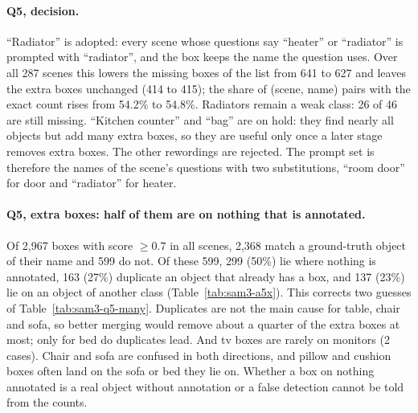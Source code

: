 \paragraph{Q5, decision.}
``Radiator'' is adopted: every scene whose questions say ``heater'' or ``radiator'' is prompted with ``radiator'',
and the box keeps the name the question uses. Over all 287 scenes this lowers the missing boxes of the list from
641 to 627 and leaves the extra boxes unchanged (414 to 415); the share of (scene, name) pairs with the exact
count rises from 54.2\% to 54.8\%. Radiators remain a weak class: 26 of 46 are still missing.
``Kitchen counter'' and ``bag'' are on hold: they find nearly all objects but add many extra boxes, so they are
useful only once a later stage removes extra boxes. The other rewordings are rejected. The prompt set is
therefore the names of the scene's questions with two substitutions, ``room door'' for door and ``radiator''
for heater.

\paragraph{Q5, extra boxes: half of them are on nothing that is annotated.}
Of 2,967 boxes with score $\geq 0.7$ in all scenes, 2,368 match a ground-truth object of their name and 599 do
not. Of these 599, 299 (50\%) lie where nothing is annotated, 163 (27\%) duplicate an object that already has a
box, and 137 (23\%) lie on an object of another class (Table~\ref{tab:sam3-a5x}). This corrects two guesses of
Table~\ref{tab:sam3-q5-many}. Duplicates are not the main cause for table, chair and sofa, so better merging
would remove about a quarter of the extra boxes at most; only for bed do duplicates lead. And tv boxes are
rarely on monitors (2 cases). Chair and sofa are confused in both directions, and pillow and cushion boxes often
land on the sofa or bed they lie on. Whether a box on nothing annotated is a real object without annotation or a
false detection cannot be told from the counts.

